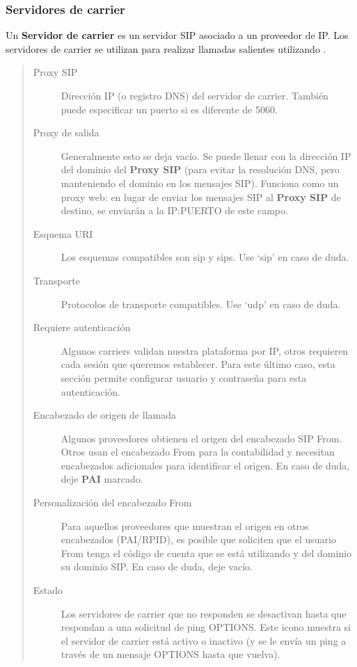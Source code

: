 \documentclass[letterpaper,10pt,spanish]{sphinxmanual}
\begin{document}
\subsubsection{Servidores de carrier}
\label{administration_portal/brand/providers/carriers:carrier-servers}
Un \textbf{Servidor de carrier} es un servidor SIP asociado a un proveedor de IP. Los servidores de carrier se utilizan para realizar llamadas salientes utilizando {\hyperref[administration_portal/brand/routing/outgoing_routings:outgoing\string-routings]{}}.
\begin{quote}
\begin{description}
\item[{Proxy SIP}] \leavevmode
Dirección IP (o registro DNS) del servidor de carrier. También puede especificar un puerto si es diferente de 5060.

\item[{Proxy de salida}] \leavevmode
Generalmente esto se deja vacío. Se puede llenar con la dirección IP del dominio del \textbf{Proxy SIP} (para evitar la resolución DNS, pero manteniendo el dominio en los mensajes SIP). Funciona como un proxy web: en lugar de enviar los mensajes SIP al \textbf{Proxy SIP} de destino, se enviarán a la IP:PUERTO de este campo.

\item[{Esquema URI}] \leavevmode
Los esquemas compatibles son sip y sips. Use `sip' en caso de duda.

\item[{Transporte}] \leavevmode
Protocolos de transporte compatibles. Use `udp' en caso de duda.

\item[{Requiere autenticación}] \leavevmode
Algunos carriers validan nuestra plataforma por IP, otros requieren cada sesión que queremos establecer. Para este último caso, esta sección permite configurar usuario y contraseña para esta autenticación.

\item[{Encabezado de origen de llamada}] \leavevmode
Algunos proveedores obtienen el origen del encabezado SIP From. Otros usan el encabezado From para la contabilidad y necesitan encabezados adicionales para identificar el origen. En caso de duda, deje \textbf{PAI} marcado.

\item[{Personalización del encabezado From}] \leavevmode
Para aquellos proveedores que muestran el origen en otros encabezados (PAI/RPID), es posible que soliciten que el usuario From tenga el código de cuenta que se está utilizando y del dominio su dominio SIP. En caso de duda, deje vacío.

\item[{Estado}] \leavevmode
Los servidores de carrier que no responden se desactivan hasta que respondan a una solicitud de ping OPTIONS. Este icono muestra si el servidor de carrier está activo o inactivo (y se le envía un ping a través de un mensaje OPTIONS hasta que vuelva).

\end{description}
\end{quote}
\end{document}
